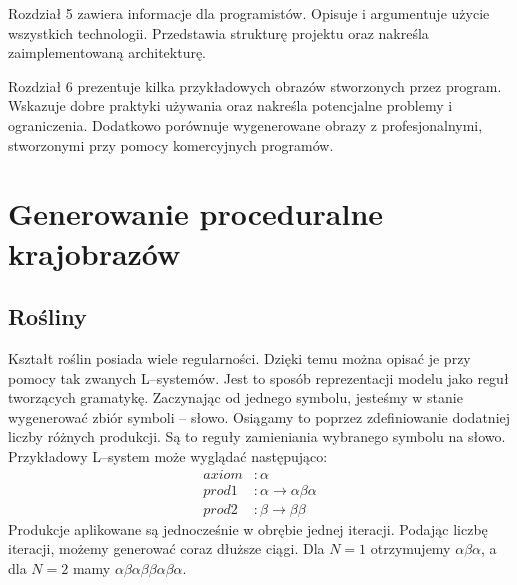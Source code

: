 \documentclass[inz,shortabstract]{iithesis}
\begin{document}
    Rozdział 5 zawiera informacje dla programistów. Opisuje i argumentuje użycie wszystkich technologii. Przedstawia strukturę projektu oraz nakreśla zaimplementowaną architekturę.
    
    Rozdział 6 prezentuje kilka przykładowych obrazów stworzonych przez program. Wskazuje dobre praktyki używania oraz nakreśla potencjalne problemy i ograniczenia. Dodatkowo porównuje wygenerowane obrazy z profesjonalnymi, stworzonymi przy pomocy komercyjnych programów.  
    
    
    
\chapter{Generowanie proceduralne krajobrazów}

    \section{Rośliny}
        Kształt roślin posiada wiele regularności. Dzięki temu można opisać je przy pomocy tak zwanych L--systemów. Jest to sposób reprezentacji modelu jako reguł tworzących gramatykę. Zaczynając od jednego symbolu, jesteśmy w stanie wygenerować zbiór symboli -- słowo. Osiągamy to poprzez zdefiniowanie dodatniej liczby różnych produkcji. Są to reguły zamieniania wybranego symbolu na słowo. Przykładowy L--system może wyglądać następująco:
        \begin{align*}
            axiom &: \alpha \\
            prod1 &: \alpha \rightarrow \alpha\beta\alpha \\
            prod2 &: \beta \rightarrow \beta\beta
        \end{align*}
        Produkcje aplikowane są jednocześnie w obrębie jednej iteracji. Podając liczbę iteracji, możemy generować coraz dłuższe ciągi. Dla $N = 1$ otrzymujemy $\alpha\beta\alpha$, a dla $N = 2$ mamy $\alpha\beta\alpha\beta\beta\alpha\beta\alpha$.
        
\end{document}
